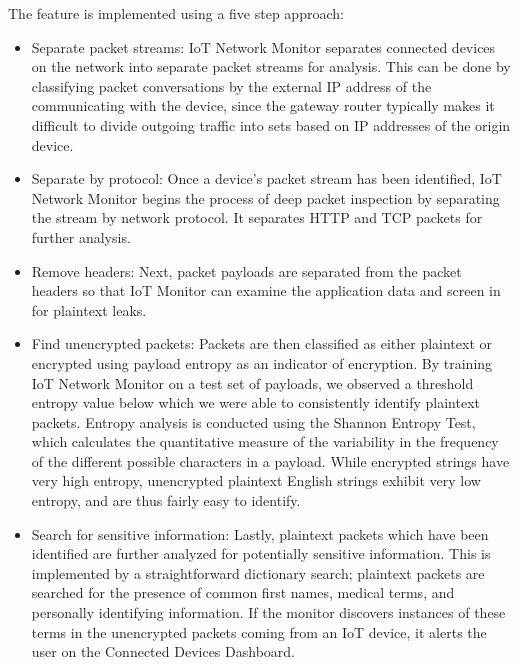 The feature is implemented using a five step approach:
\begin{itemize}
	\item Separate packet streams: IoT Network Monitor separates connected devices on the network into separate packet streams for analysis. This can be done by classifying packet conversations by the external IP address of the communicating with the device, since the gateway router typically makes it difficult to divide outgoing traffic into sets based on IP addresses of the origin device. 

	\item Separate by protocol: Once a device’s packet stream has been identified, IoT Network Monitor begins the process of deep packet inspection by separating the stream by network protocol. It separates HTTP and TCP packets for further analysis. 

	\item Remove headers: Next, packet payloads are separated from the packet headers so that IoT Monitor can examine the application data and screen in for plaintext leaks. 

	\item Find unencrypted packets: Packets are then classified as either plaintext or encrypted using payload entropy as an indicator of encryption. By training IoT Network Monitor on a test set of payloads, we observed a threshold entropy value below which we were able to consistently identify plaintext packets. Entropy analysis is conducted using the Shannon Entropy Test, which calculates the quantitative measure of the variability in the frequency of the different possible characters in a payload. While encrypted strings have very high entropy, unencrypted plaintext English strings exhibit very low entropy, and are thus fairly easy to identify. 

	\item Search for sensitive information: Lastly, plaintext packets which have been identified are further analyzed for potentially sensitive information. This is implemented by a straightforward dictionary search; plaintext packets are searched for the presence of common first names, medical terms, and personally identifying information. If the monitor discovers instances of these terms in the unencrypted packets coming from an IoT device, it alerts the user on the Connected Devices Dashboard.
\end{itemize}

